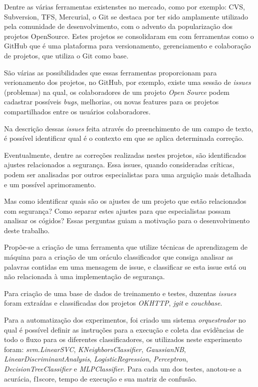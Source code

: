 \documentclass[conference]{IEEEtran}
\begin{document}
Dentre as várias ferramentas existenstes no mercado, como por exemplo: CVS, Subversion, TFS, Mercurial, o Git se destaca por ter sido amplamente utilizado pela comunidade de desenvolvimento, com o advento da popularização dos projetos OpenSource. Estes projetos se consolidaram em com ferramentas como o GitHub que é uma plataforma para versionamento, gerenciamento e colaboração de projetos, que utiliza o Git como base.

São várias as possibilidades que essas ferramentas proporcionam para verionamento dos projetos, no GitHub, por exemplo, existe uma sessão de \textit{issues} (problemas) na qual, os colaboradores de um projeto \textit{Open Source} podem cadastrar possíveis \textit{bugs}, melhorias, ou novas features para os projetos compartilhados entre os usuários colaboradores.

Na descrição dessas \textit{issues} feita através do preenchimento de um campo de texto, é possível identificar qual é o contexto em que se aplica determinada correção.

Eventualmente, dentre as correções realizadas nestes projetos, são identificados ajustes relacionados a segurança. Essa issues, quando consideradas críticas, podem ser analisadas por outros especialistas para uma arguição mais detalhada e um possível aprimoramento.

Mas como identificar quais são os ajustes de um projeto que estão relacionados com segurança? Como separar estes ajustes para que especialistas possam analisar os cógidos? Essas perguntas guiam a motivação para o desenvolvimento deste trabalho.

Propõe-se a criação de uma ferramenta que utilize técnicas de aprendizagem de máquina para a criação de um oráculo classificador que consiga analisar as palavras contidas em uma mensagem de issue, e classificar se esta issue está ou não relacionada à uma implementação de segurança.

Para criação de uma base de dados de treinamento e testes, duzentas \textit{issues} foram extraídas e classificadas dos projetos \textit{OKHTTP}, \textit{jgit} e \textit{couchbase}.

Para a automatização dos experimentos, foi criado um sistema \textit{orquestrador} no qual é possível definir as instruções para a execução e coleta das evidências de todo o fluxo para os diferentes classificadores, os utilizados neste experimento foram: \textit{svm.LinearSVC}, \textit{KNeighborsClassifier}, \textit{GaussianNB}, \textit{LinearDiscriminantAnalysis}, \textit{LogisticRegression}, \textit{Perceptron}, \textit{DecisionTreeClassifier} e \textit{MLPClassifier}. Para cada um dos testes, anotou-se a acurácia, f1score, tempo de execução e sua matriz de confusão.
\end{document}
